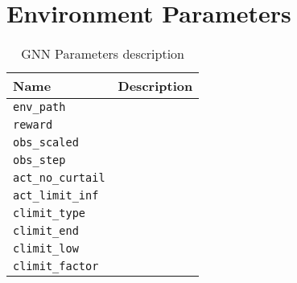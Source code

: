 \section{Environment Parameters}

\begin{table}[ht!]
	\centering
	\caption{\ac{GNN} Parameters description}
	\begin{tabular}{lp{8cm}}
		\toprule
		\textbf{Name} & \textbf{Description} \\
		\midrule
		\texttt{env\_path} & \\
		\texttt{reward} & \\
		\texttt{obs\_scaled} & \\
		\texttt{obs\_step} & \\
		\texttt{act\_no\_curtail} & \\
		\texttt{act\_limit\_inf} & \\
		\texttt{climit\_type} & \\
		\texttt{climit\_end} & \\
		\texttt{climit\_low} & \\
		\texttt{climit\_factor} & \\
		\bottomrule
	\end{tabular}
	\label{tab:env-params}
\end{table}
